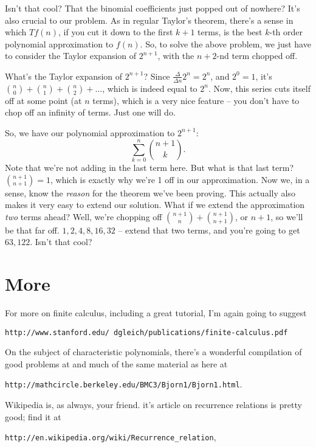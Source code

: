 \documentclass[12pt,letterpaper]{article}
\begin{document}
Isn't that cool? That the binomial coefficients just popped out of
nowhere? It's also crucial to our problem. As in regular Taylor's
theorem, there's a sense in which $T f(n)$, if you cut it down to the
first $k+1$ terms, is the best $k$-th order polynomial approximation
to $f(n)$. So, to solve the above problem, we just have to consider
the Taylor expansion of $2^{n+1}$, with the $n+2$-nd term chopped off.

What's the Taylor expansion of $2^{n+1}$? Since $\frac{\Delta}{\Delta
n} 2^n = 2^n$, and $2^0 = 1$, it's $\binom{n}{0} + \binom{n}{1} +
\binom{n}{2} + \ldots$, which is indeed equal to $2^n$. Now, this
series cuts itself off at some
point (at $n$ terms), which is a very nice feature -- you don't have
to chop off an infinity of terms. Just one will do.

So, we have our polynomial approximation to $2^{n+1}$:
$$\sum_{k=0}^{n} \binom{n+1}{k}.$$ Note that we're not adding in the
last term here. But what is that last term? $\binom{n+1}{n+1} = 1$,
which is exactly why we're 1 off in our approximation. Now we, in a
sense, know the \emph{reason} for the theorem we've been proving. This
actually also makes it very easy to extend our solution. What if we
extend the approximation \emph{two} terms ahead? Well, we're chopping
off $\binom{n+1}{n} + \binom{n+1}{n+1}$, or $n+1$, so we'll be that
far off. $1, 2, 4, 8, 16, 32$ -- extend that two terms, and you're
going to get $63, 122$. Isn't that cool?

\section{More}
For more on finite calculus, including a great tutorial, I'm again going to suggest
\begin{center}\texttt{http://www.stanford.edu/~dgleich/publications/finite-calculus.pdf}\end{center}

On the subject of characteristic polynomials, there's a wonderful
compilation of good problems at and much of the same material as here
at
\begin{center}\texttt{http://mathcircle.berkeley.edu/BMC3/Bjorn1/Bjorn1.html}.\end{center}

Wikipedia is, as always, your friend. it's article on recurrence
relations is pretty good; find it at
\begin{center}\texttt{http://en.wikipedia.org/wiki/Recurrence\_relation},\end{center}
\end{document}
